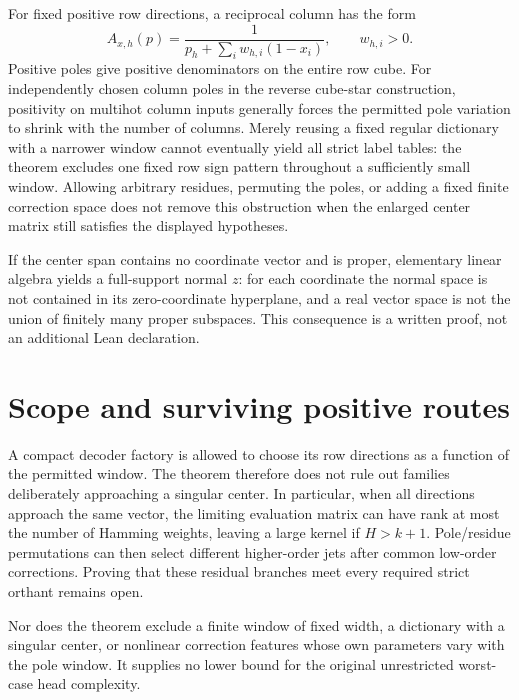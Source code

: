 \documentclass[11pt]{article}
\begin{document}
For fixed positive row directions, a reciprocal column has the form
\[
 A_{x,h}(p)=\frac{1}{p_h+\sum_i w_{h,i}(1-x_i)},\qquad w_{h,i}>0.
\]
Positive poles give positive denominators on the entire row cube. For
independently chosen column poles in the reverse cube-star construction,
positivity on multihot column inputs generally forces the permitted pole
variation to shrink with the number of columns. Merely reusing a fixed
regular dictionary with a narrower window cannot eventually yield all
strict label tables: the theorem excludes one fixed row sign pattern
throughout a sufficiently small window. Allowing arbitrary residues,
permuting the poles, or adding a fixed finite correction space does not
remove this obstruction when the enlarged center matrix still satisfies
the displayed hypotheses.

If the center span contains no coordinate vector and is proper, elementary
linear algebra yields a full-support normal $z$: for each coordinate the
normal space is not contained in its zero-coordinate hyperplane, and a
real vector space is not the union of finitely many proper subspaces.
This consequence is a written proof, not an additional Lean declaration.

\section{Scope and surviving positive routes}

A compact decoder factory is allowed to choose its row directions as a
function of the permitted window. The theorem therefore does not rule out
families deliberately approaching a singular center. In particular, when
all directions approach the same vector, the limiting evaluation matrix
can have rank at most the number of Hamming weights, leaving a large
kernel if $H>k+1$. Pole/residue permutations can then select different
higher-order jets after common low-order corrections. Proving that these
residual branches meet every required strict orthant remains open.

Nor does the theorem exclude a finite window of fixed width, a dictionary
with a singular center, or nonlinear correction features whose own
parameters vary with the pole window. It supplies no lower bound for the
original unrestricted worst-case head complexity.
\end{document}
